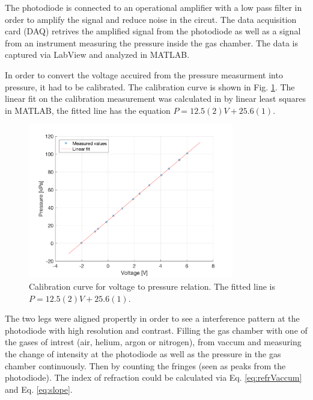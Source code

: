 The photodiode is connected to an operational amplifier with a low pass filter in order to amplify the signal and reduce noise in the circut. The data acquisition card (DAQ) retrives the amplified signal from the photodiode as well as a signal from an instrument measuring the pressure inside the gas chamber. The data is captured via LabView and analyzed in MATLAB.

In order to convert the voltage accuired from the pressure measurment into pressure, it had to be calibrated. The calibration curve is shown in Fig. \ref{fig:calibration}. The linear fit on the calibration measurement was calculated in by linear least squares in MATLAB, the fitted line has the equation $P = 12.5(2)V+25.6(1)$.


\begin{figure}[H]
  \centering
  \includegraphics[width=0.8\textwidth]{matlab/calibration.png}
  \caption{Calibration curve for voltage to pressure relation. The fitted line is $P = 12.5(2)V+25.6(1)$.}
  \label{fig:calibration}
\end{figure}

The two legs were aligned propertly in order to see a interference pattern at the photodiode with high resolution and contrast. Filling the gas chamber with one of the gases of intrest (air, helium, argon or nitrogen), from vaccum and measuring the change of intensity at the photodiode as well as the pressure in the gas chamber continuously. Then by counting the fringes (seen as peaks from the photodiode). The index of refraction could be calculated via Eq. \ref{eq:refrVaccum} and Eq. \ref{eq:slope}.




